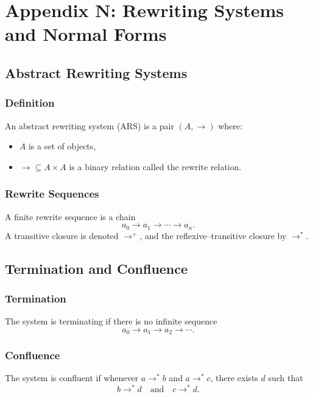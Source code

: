 \chapter*{Appendix N: Rewriting Systems and Normal Forms}

\section{Abstract Rewriting Systems}

\subsection{Definition}

An abstract rewriting system (ARS) is a pair $(A,\to)$ where:
\begin{itemize}
\item $A$ is a set of objects,
\item $\to \subseteq A \times A$ is a binary relation called the rewrite relation.
\end{itemize}

\subsection{Rewrite Sequences}

A finite rewrite sequence is a chain
\[
a_0 \to a_1 \to \cdots \to a_n.
\]
A transitive closure is denoted $\to^+$, and the reflexive–transitive closure by $\to^\ast$.

\section{Termination and Confluence}

\subsection{Termination}

The system is terminating if there is no infinite sequence
\[
a_0 \to a_1 \to a_2 \to \cdots.
\]

\subsection{Confluence}

The system is confluent if whenever $a \to^\ast b$ and $a \to^\ast c$, there exists $d$ such that
\[
b \to^\ast d
\quad\text{and}\quad
c \to^\ast d.
\]

